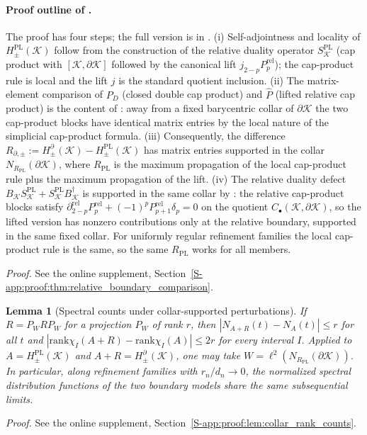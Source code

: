 \documentclass[11pt]{article}
\numberwithin{equation}{section}
\newtheorem{lemma}[theorem]{Lemma}
\theoremstyle{definition}
\theoremstyle{remark}
\newcommand{\proofsuppref}[1]{%
  \par\noindent\emph{Proof.} See the online supplement, Section~\ref{S-#1}.\par\medskip
}
\newcommand{\K}{\mathcal{K}}
\newcommand{\bd}{\partial}
\newcommand{\rank}{\mathrm{rank}}
\begin{document}
\paragraph{Proof outline of .}
The proof has four steps; the full version is in
.
(i) Self-adjointness and locality of \(H^{\mathrm{PL}}_\pm(\K)\) follow from the construction of
the relative duality operator \(S^{\mathrm{PL}}_\K\) (cap product with \([\K,\bd\K]\) followed
by the canonical lift \(j_{2-p}P^{\mathrm{rel}}_p\)); the cap-product rule is local and the lift
\(j\) is the standard quotient inclusion.
(ii) The matrix-element comparison of \(P_D\) (closed double cap product) and
\(\widehat P\) (lifted relative cap product) is the content of
: away from a fixed barycentric collar of \(\bd\K\) the
two cap-product blocks have identical matrix entries by the local nature of the simplicial
cap-product formula.
(iii) Consequently, the difference
\(R_{\partial,\pm}:=H_\pm^{\bd}(\K)-H^{\mathrm{PL}}_\pm(\K)\) has matrix entries supported in
the collar \(N_{R_{\mathrm{PL}}}(\bd\K)\), where \(R_{\mathrm{PL}}\) is the maximum
propagation of the local cap-product rule plus the maximum propagation of the lift.
(iv) The relative duality defect
\(B_\K S^{\mathrm{PL}}_\K+S^{\mathrm{PL}}_\K B_\K^\dagger\) is supported in the same collar by
: the relative cap-product blocks satisfy
\(\partial^{\mathrm{rel}}_{2-p}P^{\mathrm{rel}}_p+(-1)^p P^{\mathrm{rel}}_{p+1}\delta_p=0\) on
the quotient \(C_\bullet(\K,\bd\K)\), so the lifted version has nonzero contributions only at
the relative boundary, supported in the same fixed collar. For uniformly regular refinement
families the local cap-product rule is the same, so the same \(R_{\mathrm{PL}}\) works for all
members.

\proofsuppref{app:proof:thm:relative_boundary_comparison}

\begin{lemma}[Spectral counts under collar-supported perturbations]\label{lem:collar_rank_counts}
If $R=P_W R P_W$ for a projection $P_W$ of rank $r$, then
$|N_{A+R}(t)-N_A(t)|\le r$ for all $t$ and
$|\rank\chi_I(A+R)-\rank\chi_I(A)|\le 2r$ for every interval $I$. Applied to
$A=H^{\mathrm{PL}}_{\pm}(\K)$ and $A+R=H_{\pm}^{\bd}(\K)$, one may take
$W=\ell^2(N_{R_{\mathrm{PL}}}(\bd\K))$. In particular, along refinement families with
$r_n/d_n\to0$, the normalized spectral distribution functions of the two boundary models share
the same subsequential limits.
\end{lemma}
\proofsuppref{app:proof:lem:collar_rank_counts}
\end{document}

